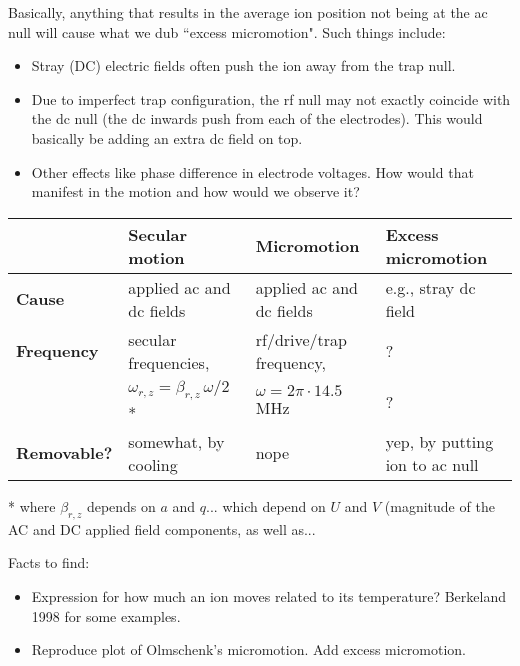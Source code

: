 \documentclass{article}
\begin{document}
Basically, anything that results in the average ion position not being at the ac null will cause what we dub ``excess micromotion". Such things include:

\begin{itemize}
\item Stray (DC) electric fields often push the ion away from the trap null. 
\item Due to imperfect trap configuration, the rf null may not exactly coincide with the dc null (the dc inwards push from each of the electrodes). This would basically be adding an extra dc field on top.
\item Other effects like phase difference in electrode voltages. How would that manifest in the motion and how would we observe it?  
\end{itemize}

\vspace{0mm}
\begin{center}
\begin{tabular}{l l l l} \toprule
& \textbf{Secular motion} & \textbf{Micromotion} & \textbf{Excess micromotion} \\ \midrule
\textbf{Cause} & applied ac and dc fields & applied ac and dc fields & e.g., stray dc field \\
\textbf{Frequency} & secular frequencies, & rf/drive/trap frequency, & ? \\
 & $\omega_{r, z} = \beta_{r,z} \, \omega /2$ *&  $\omega = 2 \pi \cdot 14.5$ MHz & ? \\
\textbf{Removable?} & somewhat, by cooling & nope & yep, by putting ion to ac null \\
\bottomrule
\end{tabular}
\end{center}

\vspace{2mm}

* where $\beta_{r,z}$ depends on $a$ and $q$... which depend on $U$ and $V$ (magnitude of the AC and DC applied field components, as well as...


\vspace{5mm} \noindent Facts to find:

\begin{itemize}
\item Expression for how much an ion moves related to its temperature? Berkeland 1998 for some examples.
\item Reproduce plot of Olmschenk's micromotion. Add excess micromotion.
\end{itemize}
\end{document}

